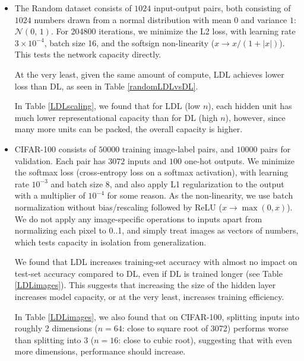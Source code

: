 \documentclass{article}
\begin{document}
\begin{itemize}
\item The Random dataset consists of $1024$ input-output pairs, both consisting of $1024$ numbers drawn from a normal distribution with mean $0$ and variance $1$: $\mathcal{N}(0,\,1)$. For 204800 iterations, we minimize the L2 loss, with learning rate $3 \times 10^{-4}$, batch size 16, and the softsign non-linearity ($x \rightarrow x/(1+|x|)$). This tests the network capacity directly.

At the very least, given the same amount of compute, LDL achieves lower loss than DL, as seen in Table \ref{randomLDLvsDL}.

In Table \ref{LDLscaling}, we found that for LDL (low $n$), each hidden unit has much lower representational capacity than for DL (high $n$), however, since many more units can be packed, the overall capacity is higher.

\item CIFAR-100 consists of $50000$ training image-label pairs, and $10000$ pairs for validation. Each pair has $3072$ inputs and $100$ one-hot outputs. We minimize the softmax loss (cross-entropy loss on a softmax activation), with learning rate $10^{-3}$ and batch size 8, and also apply L1 regularization to the output with a multiplier of $10^{-4}$ for some reason. As the non-linearity, we use batch normalization \cite{ioffe2015batch} without bias/rescaling followed by ReLU ($x \rightarrow \max(0,x)$). We do not apply any image-specific operations to inputs apart from normalizing each pixel to 0..1, and simply treat images as vectors of numbers, which tests capacity in isolation from generalization.

We found that LDL increases training-set accuracy with almost no impact on test-set accuracy compared to DL, even if DL is trained longer (see Table \ref{LDLimages}). This suggests that increasing the size of the hidden layer increases model capacity, or at the very least, increases training efficiency.

In Table \ref{LDLimages}, we also found that on CIFAR-100, splitting inputs into roughly 2 dimensions ($n=64$: close to square root of 3072) performs worse than splitting into 3 ($n=16$: close to cubic root), suggesting that with even more dimensions, performance should increase.
\end{itemize}
\end{document}
